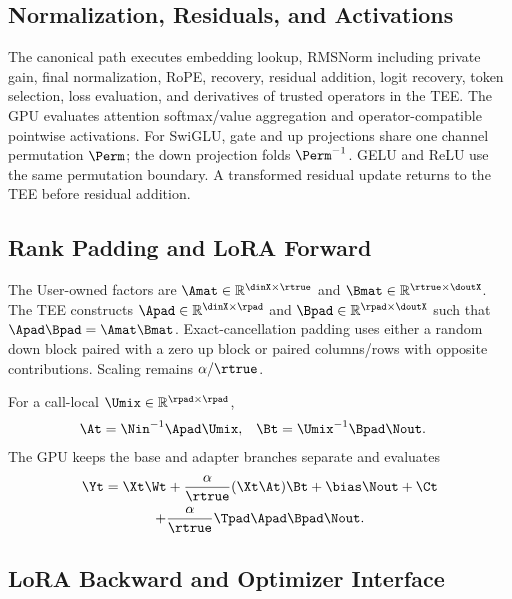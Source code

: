 \subsection{Normalization, Residuals, and Activations}

The canonical path executes embedding lookup, RMSNorm including private gain,
final normalization, RoPE, recovery, residual addition, logit recovery, token
selection, loss evaluation, and derivatives of trusted operators in the TEE.
The GPU evaluates attention softmax/value aggregation and operator-compatible
pointwise activations. For SwiGLU, gate and up projections share one channel
permutation $\Perm$; the down projection folds $\Perm^{-1}$. GELU and ReLU use
the same permutation boundary. A transformed residual update returns to the
TEE before residual addition.

\subsection{Rank Padding and LoRA Forward}

The User-owned factors are
$\Amat\in\mathbb{R}^{\dinX\times\rtrue}$ and
$\Bmat\in\mathbb{R}^{\rtrue\times\doutX}$. The TEE constructs
$\Apad\in\mathbb{R}^{\dinX\times\rpad}$ and
$\Bpad\in\mathbb{R}^{\rpad\times\doutX}$ such that
$\Apad\Bpad=\Amat\Bmat$. Exact-cancellation padding uses either a random down
block paired with a zero up block or paired columns/rows with opposite
contributions. Scaling remains $\alpha/\rtrue$.

For a call-local $\Umix\in\mathbb{R}^{\rpad\times\rpad}$,
\begin{align}
\At&=\Nin^{-1}\Apad\Umix,&
\Bt&=\Umix^{-1}\Bpad\Nout.
\label{eq:app-lora-factors}
\end{align}
The GPU keeps the base and adapter branches separate and evaluates
\begin{multline}
\Yt=\Xt\Wt+\frac{\alpha}{\rtrue}(\Xt\At)\Bt+\bias\Nout+\Ct\\
+\frac{\alpha}{\rtrue}\Tpad\Apad\Bpad\Nout.
\label{eq:app-lora-forward}
\end{multline}

\subsection{LoRA Backward and Optimizer Interface}

